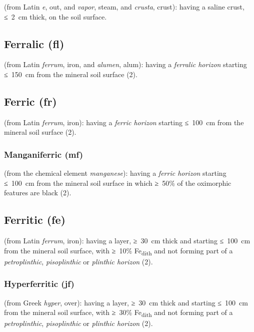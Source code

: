 \documentclass[
  letterpaper,
  DIV=11,
  numbers=noendperiod]{scrreprt}
\begin{document}
(from Latin \emph{e}, out, and \emph{vapor}, steam, and \emph{crusta},
crust): having a saline crust, ≤~2~cm thick, on the soil surface.

\hypertarget{ferralic-fl}{%
\subsection{Ferralic (fl)}\label{ferralic-fl}}

(from Latin \emph{ferrum}, iron, and \emph{alumen}, alum): having a
\emph{ferralic horizon} starting ≤~150~cm from the mineral soil surface
(2).

\hypertarget{ferric-fr}{%
\subsection{Ferric (fr)}\label{ferric-fr}}

(from Latin \emph{ferrum}, iron): having a \emph{ferric horizon}
starting ≤~100~cm from the mineral soil surface (2).

\hypertarget{manganiferric-mf}{%
\subsubsection{Manganiferric (mf)}\label{manganiferric-mf}}

(from the chemical element \emph{manganese}): having a \emph{ferric
horizon} starting ≤~100~cm from the mineral soil surface in which ≥~50\%
of the oximorphic features are black (2).

\hypertarget{ferritic-fe}{%
\subsection{Ferritic (fe)}\label{ferritic-fe}}

(from Latin \emph{ferrum}, iron): having a layer, ≥~30~cm thick and
starting ≤~100~cm from the mineral soil surface, with ≥~10\%
Fe\textsubscript{dith} and not forming part of a \emph{petroplinthic},
\emph{pisoplinthic} or \emph{plinthic horizon} (2).

\hypertarget{hyperferritic-jf}{%
\subsubsection{Hyperferritic (jf)}\label{hyperferritic-jf}}

(from Greek \emph{hyper}, over): having a layer, ≥~30~cm thick and
starting ≤~100~cm from the mineral soil surface, with ≥~30\%
Fe\textsubscript{dith} and not forming part of a \emph{petroplinthic},
\emph{pisoplinthic} or \emph{plinthic horizon} (2).
\end{document}
